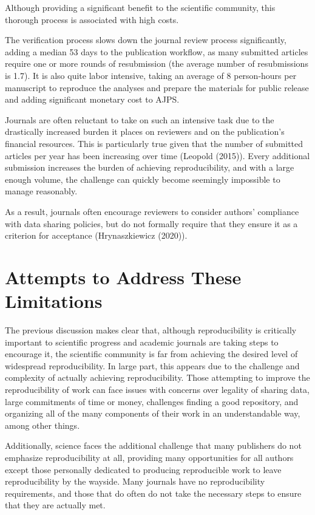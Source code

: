 \documentclass[12pt,twoside]{reedthesis}
\begin{document}
Although providing a significant benefit to the scientific community,
this thorough process is associated with high costs.

The verification process slows down the journal review process
significantly, adding a median 53 days to the publication workflow, as
many submitted articles require one or more rounds of resubmission (the
average number of resubmissions is 1.7). It is also quite labor
intensive, taking an average of 8 person-hours per manuscript to
reproduce the analyses and prepare the materials for public release and
adding significant monetary cost to AJPS.

Journals are often reluctant to take on such an intensive task due to
the drastically increased burden it places on reviewers and on the
publication's financial resources. This is particularly true given that
the number of submitted articles per year has been increasing over time
(Leopold (2015)). Every additional submission increases the burden of
achieving reproducibility, and with a large enough volume, the challenge
can quickly become seemingly impossible to manage reasonably.

As a result, journals often encourage reviewers to consider authors'
compliance with data sharing policies, but do not formally require that
they ensure it as a criterion for acceptance (Hrynaszkiewicz (2020)).

\section{Attempts to Address These
Limitations}\label{attempts-to-address-these-limitations}

The previous discussion makes clear that, although reproducibility is
critically important to scientific progress and academic journals are
taking steps to encourage it, the scientific community is far from
achieving the desired level of widespread reproducibility. In large
part, this appears due to the challenge and complexity of actually
achieving reproducibility. Those attempting to improve the
reproducibility of work can face issues with concerns over legality of
sharing data, large commitments of time or money, challenges finding a
good repository, and organizing all of the many components of their work
in an understandable way, among other things.

Additionally, science faces the additional challenge that many
publishers do not emphasize reproducibility at all, providing many
opportunities for all authors except those personally dedicated to
producing reproducible work to leave reproducibility by the wayside.
Many journals have no reproducibility requirements, and those that do
often do not take the necessary steps to ensure that they are actually
met.
\end{document}
